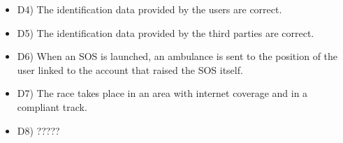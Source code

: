 \documentclass{article}
\begin{document}
\begin{legal}
\begin{legal}
\begin{legal}
{\begin{itemize}
				\item D4) The identification data provided by the users are correct.\\
				\item D5) The identification data provided by the third parties are correct.\\
				\item D6) When an SOS is launched, an ambulance is sent to the position of the user linked to the account that raised the SOS itself. \\
				\item D7) The race takes place in an area with internet coverage and in a compliant track.\\
				\item D8) ?????
				\end{itemize}
			}
			\end{legal}
		\end{legal}
	

\end{legal}
\end{document}
